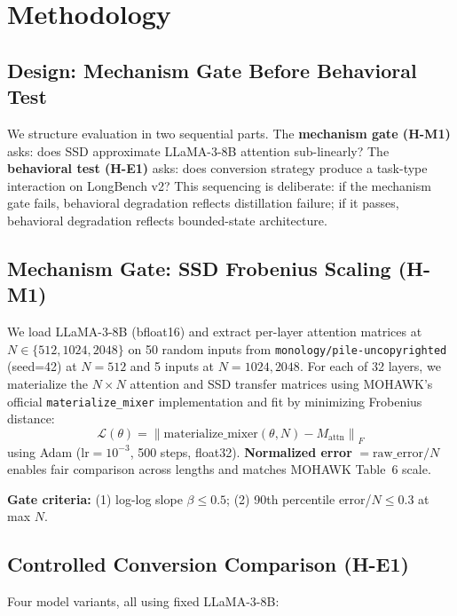 \section{Methodology}

\subsection{Design: Mechanism Gate Before Behavioral Test}

We structure evaluation in two sequential parts. The \textbf{mechanism gate (H-M1)} asks: does
SSD approximate LLaMA-3-8B attention sub-linearly? The \textbf{behavioral test (H-E1)} asks:
does conversion strategy produce a task-type interaction on LongBench v2? This sequencing is
deliberate: if the mechanism gate fails, behavioral degradation reflects distillation failure;
if it passes, behavioral degradation reflects bounded-state architecture.

\subsection{Mechanism Gate: SSD Frobenius Scaling (H-M1)}

We load LLaMA-3-8B (bfloat16) and extract per-layer attention matrices at
$N \in \{512, 1024, 2048\}$ on 50 random inputs from \texttt{monology/pile-uncopyrighted}
(seed=42) at $N=512$ and 5 inputs at $N=1024, 2048$. For each of 32 layers, we materialize
the $N \times N$ attention and SSD transfer matrices using MOHAWK's official
\texttt{materialize\_mixer} implementation and fit by minimizing Frobenius distance:
\begin{equation}
  \mathcal{L}(\theta) = \left\| \text{materialize\_mixer}(\theta, N) - M_{\text{attn}} \right\|_F
\end{equation}
using Adam (lr$=10^{-3}$, 500 steps, float32). \textbf{Normalized error} $= \text{raw\_error} / N$
enables fair comparison across lengths and matches MOHAWK Table~6 scale.

\textbf{Gate criteria:} (1) log-log slope $\beta \leq 0.5$; (2) 90th percentile error/$N \leq 0.3$
at max $N$.

\subsection{Controlled Conversion Comparison (H-E1)}

Four model variants, all using fixed LLaMA-3-8B:

